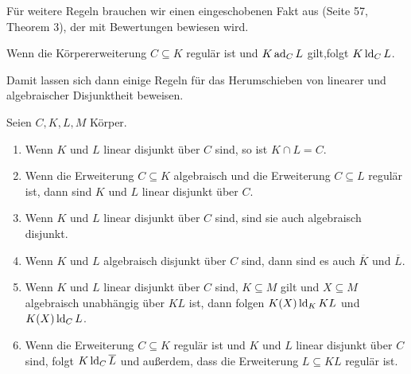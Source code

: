     Für weitere Regeln brauchen wir einen eingeschobenen Fakt aus \cite{SergeLang} (Seite 57, Theorem 3), der mit Bewertungen bewiesen wird.
    \begin{fact}\label{Das komplizierte Lemma}
    	Wenn die Körpererweiterung $C\subseteq K$ regulär ist und $K\operatorname{ad}_CL$ gilt,\linebreak folgt $K\operatorname{ld}_CL$.
    \end{fact}
    
    Damit lassen sich dann einige Regeln für das \glqq{}Herumschieben\grqq{} von linearer und algebraischer Disjunktheit beweisen.\newpage
    \begin{lemma}\label{Rechenregeln}
    	Seien $C,K,L,M$ Körper.
    	\begin{enumerate}
    		\item Wenn $K$ und $L$ linear disjunkt über $C$ sind, so ist $K\cap L=C$.
    		\item Wenn die Erweiterung $C\subseteq K$ algebraisch und die Erweiterung $C\subseteq L$ regulär ist, dann sind $K$ und $L$ linear disjunkt über $C$.
    		\item Wenn $K$ und $L$ linear disjunkt über $C$ sind, sind sie auch algebraisch disjunkt.
    		\item Wenn $K$ und $L$ algebraisch disjunkt über $C$ sind, dann sind es auch $\overline{K}$ und $\overline{L}$.
    		\item Wenn $K$ und $L$ linear disjunkt über $C$ sind, $K\subseteq M$ gilt und $X\subseteq M$ algebraisch unabhängig über $KL$ ist, dann folgen $K(X)\operatorname{ld}_KKL$ und $K(X)\operatorname{ld}_CL$.
    		\item Wenn die Erweiterung $C\subseteq K$ regulär ist und $K$ und $L$ linear disjunkt über $C$ sind, folgt $K\operatorname{ld}_C\overline{L}$ und außerdem, dass die Erweiterung $L\subseteq KL$ regulär ist.
    	\end{enumerate}
    \end{lemma}
